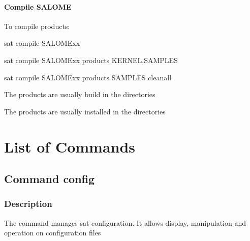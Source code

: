 \documentclass[a4paper,10pt,english]{sphinxmanual}
\begin{document}
\subsubsection{Compile SALOME}
\label{\detokenize{usage_of_sat:compile-salome}}
To compile products:

%
\begin{sphinxVerbatim}[commandchars=\\\{\}]
sat compile SALOME\PYGZus{}xx

sat compile SALOME\PYGZus{}xx \PYGZhy{}\PYGZhy{}products KERNEL,SAMPLES

sat compile SALOME\PYGZus{}xx \PYGZhy{}\PYGZhy{}\PYGZhy{}products SAMPLES \PYGZhy{}\PYGZhy{}clean\PYGZus{}all
\end{sphinxVerbatim}

\begin{DUlineblock}{0em}
\item[] The products are usually build in the directories
\item[] 
\item[] 
\item[] The products are usually installed in the directories
\item[] 
\end{DUlineblock}


\chapter{List of Commands}
\label{\detokenize{index:list-of-commands}}
\clearpage


\section{Command config}
\label{\detokenize{commands/config:svn}}\label{\detokenize{commands/config:command-config}}\label{\detokenize{commands/config::doc}}

\subsection{Description}
\label{\detokenize{commands/config:description}}
The  command manages sat configuration.
It allows display, manipulation and operation on configuration files
\end{document}
